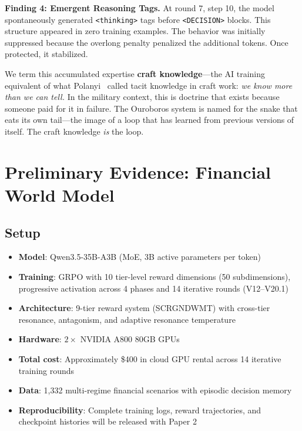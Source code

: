 \documentclass[11pt,a4paper]{article}
\begin{document}
\textbf{Finding 4: Emergent Reasoning Tags.} At round 7, step 10, the model spontaneously generated \texttt{<thinking>} tags before \texttt{<DECISION>} blocks. This structure appeared in zero training examples. The behavior was initially suppressed because the overlong penalty penalized the additional tokens. Once protected, it stabilized.

We term this accumulated expertise \textbf{craft knowledge}---the AI training equivalent of what Polanyi~\citep{polanyi1966} called tacit knowledge in craft work: \textit{we know more than we can tell.} In the military context, this is doctrine that exists because someone paid for it in failure. The Ouroboros system is named for the snake that eats its own tail---the image of a loop that has learned from previous versions of itself. The craft knowledge \textit{is} the loop.

\section{Preliminary Evidence: Financial World Model}

\subsection{Setup}

\begin{itemize}[leftmargin=*]
\item \textbf{Model}: Qwen3.5-35B-A3B (MoE, 3B active parameters per token)
\item \textbf{Training}: GRPO with 10 tier-level reward dimensions (50 subdimensions), progressive activation across 4 phases and 14 iterative rounds (V12--V20.1)
\item \textbf{Architecture}: 9-tier reward system (SCRGNDWMT) with cross-tier resonance, antagonism, and adaptive resonance temperature
\item \textbf{Hardware}: $2\times$ NVIDIA A800 80GB GPUs
\item \textbf{Total cost}: Approximately \$400 in cloud GPU rental across 14 iterative training rounds
\item \textbf{Data}: 1,332 multi-regime financial scenarios with episodic decision memory
\item \textbf{Reproducibility}: Complete training logs, reward trajectories, and checkpoint histories will be released with Paper 2
\end{itemize}
\end{document}
